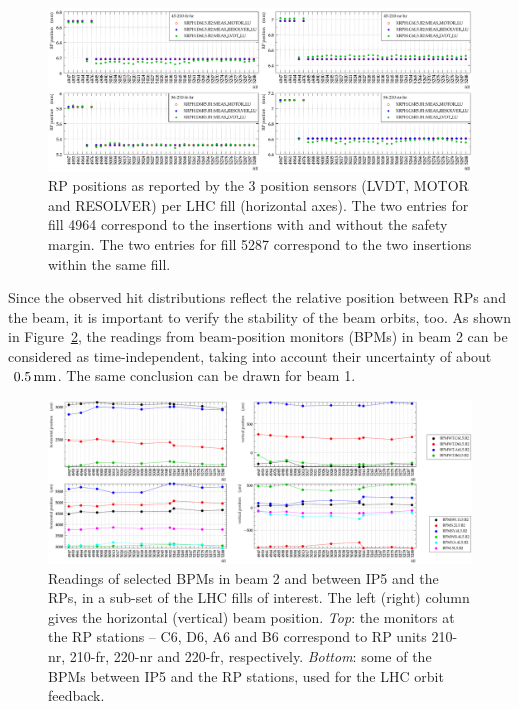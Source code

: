\documentclass[TOTEM]{cern/cernphprep}
\def\un#1{\,{\rm #1}}
\begin{document}
\begin{figure}[h!]
\begin{center}
\includegraphics[width=1\hsize]{fig/conditions/rp_positions_rps.pdf}
\caption{%
RP positions as reported by the 3 position sensors (LVDT, MOTOR and RESOLVER) per LHC fill (horizontal axes). The two entries for fill 4964 correspond to the insertions with and without the safety margin. The two entries for fill 5287 correspond to the two insertions within the same fill.
}
\label{fig:cond_rp}
\end{center}
\end{figure}


Since the observed hit distributions reflect the relative position between RPs and the beam, it is important to verify the stability of the beam orbits, too. As shown in Figure~\ref{fig:cond_bpm}, the readings from beam-position monitors (BPMs) in beam 2 can be considered as time-independent, taking into account their uncertainty of about $~0.5\un{mm}$. The same conclusion can be drawn for beam 1.

\begin{figure}[h!]
\begin{center}
\includegraphics[width=1\hsize]{fig/conditions/bpm_comparison.pdf}
\caption{%
Readings of selected BPMs in beam 2 and between IP5 and the RPs, in a sub-set of the LHC fills of interest. The left (right) column gives the horizontal (vertical) beam position.
{\it Top}: the monitors at the RP stations -- C6, D6, A6 and B6 correspond to RP units 210-nr, 210-fr, 220-nr and 220-fr, respectively.
{\it Bottom}: some of the BPMs between IP5 and the RP stations, used for the LHC orbit feedback.
}
\label{fig:cond_bpm}
\end{center}
\end{figure}
\end{document}
